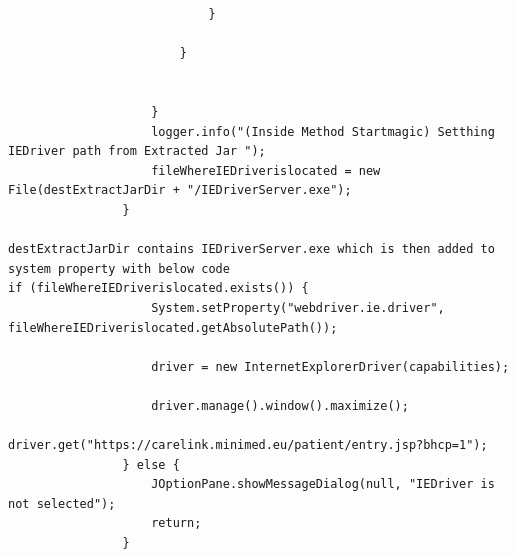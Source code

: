 \documentclass[12pt]{report}
\begin{document}
\begin{verbatim}
							}
							
						}
						

					}
					logger.info("(Inside Method Startmagic) Setthing IEDriver path from Extracted Jar ");
					fileWhereIEDriverislocated = new File(destExtractJarDir + "/IEDriverServer.exe");
				}

destExtractJarDir contains IEDriverServer.exe which is then added to system property with below code
if (fileWhereIEDriverislocated.exists()) {
					System.setProperty("webdriver.ie.driver", fileWhereIEDriverislocated.getAbsolutePath());

					driver = new InternetExplorerDriver(capabilities);

					driver.manage().window().maximize();
					driver.get("https://carelink.minimed.eu/patient/entry.jsp?bhcp=1");
				} else {
					JOptionPane.showMessageDialog(null, "IEDriver is not selected");
					return;
				}
\end{verbatim}
\end{document}
